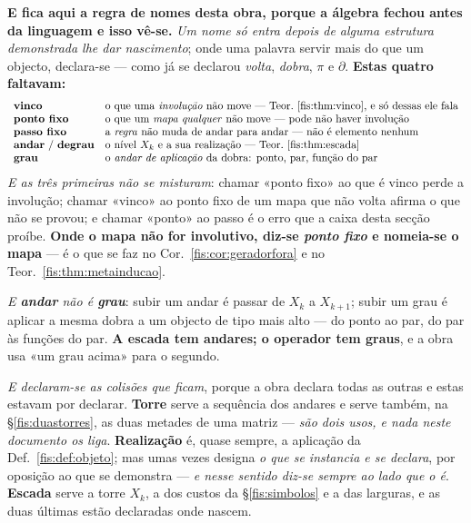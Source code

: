 \documentclass[livro.tex]{subfiles}
\begin{document}
\medskip\noindent\textbf{E fica aqui a regra de nomes desta obra, porque a álgebra
fechou antes da linguagem e isso vê-se.} \emph{Um nome só entra depois de alguma
estrutura demonstrada lhe dar nascimento}; onde uma palavra servir mais do que um
objecto, declara-se --- como já se declarou \emph{volta}, \emph{dobra}, $\pi$ e
$\partial$. \textbf{Estas quatro faltavam:}
\[
\begin{array}{ll}
\textbf{vinco} & \text{o que uma \emph{involução} não move --- Teor.~\ref{fis:thm:vinco}, e só dessas ele fala}\\
\textbf{ponto fixo} & \text{o que um \emph{mapa qualquer} não move --- pode não haver involução}\\
\textbf{passo fixo} & \text{a \emph{regra} não muda de andar para andar --- não é elemento nenhum}\\
\textbf{andar}\ /\ \textbf{degrau} & \text{o nível }X_k\text{ e a sua realização --- Teor.~\ref{fis:thm:escada}}\\
\textbf{grau} & \text{o \emph{andar de aplicação} da dobra: ponto, par, função do par}
\end{array}
\]
\emph{E as três primeiras não se misturam}: chamar «ponto fixo» ao que é vinco
perde a involução; chamar «vinco» ao ponto fixo de um mapa que não volta afirma o
que não se provou; e chamar «ponto» ao passo é o erro que a caixa desta secção
proíbe. \textbf{Onde o mapa não for involutivo, diz-se \emph{ponto fixo} e nomeia-se
o mapa} --- é o que se faz no Cor.~\ref{fis:cor:geradorfora} e no
Teor.~\ref{fis:thm:metainducao}.

\emph{E \textbf{andar} não é \textbf{grau}}: subir um andar é passar de $X_k$ a
$X_{k+1}$; subir um grau é aplicar a mesma dobra a um objecto de tipo mais alto ---
do ponto ao par, do par às funções do par. \textbf{A escada tem andares; o operador
tem graus}, e a obra usa «um grau acima» para o segundo.

\smallskip\noindent\emph{E declaram-se as colisões que ficam}, porque a obra
declara todas as outras e estas estavam por declarar. \textbf{Torre} serve a
sequência dos andares e serve também, na §\ref{fis:duastorres}, as duas metades de
uma matriz --- \emph{são dois usos, e nada neste documento os liga}.
\textbf{Realização} é, quase sempre, a aplicação da Def.~\ref{fis:def:objeto}; mas
umas vezes designa \emph{o que se instancia e se declara}, por oposição ao que se
demonstra --- \emph{e nesse sentido diz-se sempre ao lado que o é}. \textbf{Escada}
serve a torre $X_k$, a dos custos da §\ref{fis:simbolos} e a das larguras, e as
duas últimas estão declaradas onde nascem.
\end{document}
